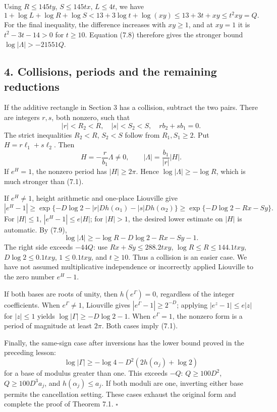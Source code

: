 \documentclass[
  11pt,
  a4paper,
]{article}
\begin{document}
Using \(R\le145ty\), \(S\le145tx\), \(L\le4t\), we have \[
1+\log L+\log R+\log S
<13+3\log t+\log(xy)
\le13+3t+xy\le t^2xy=Q.
\] For the final inequality, the difference increases with \(xy\ge1\),
and at \(xy=1\) it is \(t^2-3t-14>0\) for \(t\ge10\). Equation (7.8)
therefore gives the stronger bound \(\log|\Lambda|>-21551Q\).

\subsection{4. Collisions, periods and the remaining
reductions}\label{collisions-periods-and-the-remaining-reductions}

If the additive rectangle in Section 3 has a collision, subtract the two
pairs. There are integers \(r,s\), both nonzero, such that \[
|r|<R_2<R,\quad |s|<S_2<S,\quad rb_2+sb_1=0.
\] The strict inequalities \(R_2<R\), \(S_2<S\) follow from
\(R_1,S_1\ge2\). Put \(H=r\ell_1+s\ell_2\). Then \[
H=-\frac r{b_1}\Lambda\ne0,\qquad
|\Lambda|=\frac{b_1}{|r|}|H|. \tag{7.9}
\] If \(e^H=1\), the nonzero period has \(|H|\ge2\pi\). Hence
\(\log|\Lambda|\ge-\log R\), which is much stronger than (7.1).

If \(e^H\ne1\), height arithmetic and one-place Liouville give \[
|e^H-1|\ge
\exp\{-D\log2-|r|Dh(\alpha_1)-|s|Dh(\alpha_2)\}
\ge\exp\{-D\log2-Rx-Sy\}.
\] For \(|H|\le1\), \(|e^H-1|\le e|H|\); for \(|H|>1\), the desired
lower estimate on \(|H|\) is automatic. By (7.9), \[
\log|\Lambda|\ge-\log R-D\log2-Rx-Sy-1.
\] The right side exceeds \(-44Q\): use \(Rx+Sy\le288.2txy\),
\(\log R\le R\le144.1txy\), \(D\log2\le0.1txy\), \(1\le0.1txy\), and
\(t\ge10\). Thus a collision is an easier case. We have not assumed
multiplicative independence or incorrectly applied Liouville to the zero
number \(e^H-1\).

If both bases are roots of unity, then \(h(e^\Gamma)=0\), regardless of
the integer coefficients. When \(e^\Gamma\ne1\), Liouville gives
\(|e^\Gamma-1|\ge2^{-D}\); applying \(|e^z-1|\le e|z|\) for \(|z|\le1\)
yields \(\log|\Gamma|\ge-D\log2-1\). When \(e^\Gamma=1\), the nonzero
form is a period of magnitude at least \(2\pi\). Both cases imply (7.1).

Finally, the same-sign case after inversions has the lower bound proved
in the preceding lesson: \[
\log|\Gamma|\ge-\log4-D^2(2h(\alpha_j)+\log2)
\] for a base of modulus greater than one. This exceeds \(-Q\):
\(Q\ge100D^2\), \(Q\ge100D^3a_j\), and \(h(\alpha_j)\le a_j\). If both
moduli are one, inverting either base permits the cancellation setting.
These cases exhaust the original form and complete the proof of Theorem
7.1. \(\square\)
\end{document}
